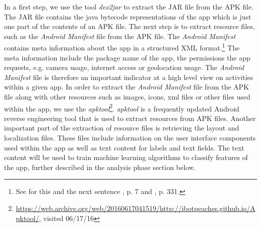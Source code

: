 In a first step, we use the tool \textit{dex2jar} to extract the \acs{JAR} file from the APK file.
The JAR file contains the java bytecode representations of the app which is just one part of the contents of an \acs{APK} file.
The next step is to extract resource files, such as the \textit{Android Manifest} file from the APK file.
The \textit{Android Manifest} contains meta information about the app in a structured XML format.\footnote{See for this and the next sentence \cite{xu2013}, p. 7 and \cite{Shabtai2010}, p. 331.}
The meta information include the package name of the app, the permissions the app requests, e.g. camera usage, internet access or geolocation usage.
The \textit{Android Manifest} file is therefore an important indicator at a high level view on activities within a given app.
In order to extract the \textit{Android Manifest} file from the APK file along with other resources such as images, icons, xml files or other files used within the app, we use the \textit{apktool}\footnote{\url{https://web.archive.org/web/20160617041519/http://ibotpeaches.github.io/Apktool/}, visited 06/17/16}.
\textit{apktool} is a frequently updated Android reverse engineering tool that is used to extract resources from APK files.
Another important part of the extraction of resource files is retrieving the layout and localization files.
These files include information on the user interface components used within the app as well as text content for labels and text fields.
The text content will be used to train machine learning algorithms to classify features of the app, further described in the analysis phase section below.

